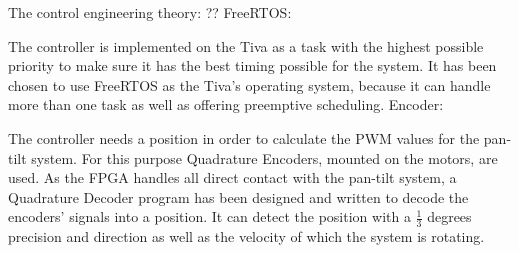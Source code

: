 \documentclass[../../main]{subfiles}
\begin{document}
The control engineering theory:
??
FreeRTOS:

The controller is implemented on the Tiva as a task with the highest possible priority to make sure it has the best timing possible for the system. It has been chosen to use FreeRTOS as the Tiva's operating system, because it can handle more than one task as well as offering preemptive scheduling.
Encoder:

The controller needs a position in order to calculate the PWM values for the pan-tilt system. For this purpose Quadrature Encoders, mounted on the motors, are used.
As the FPGA handles all direct contact with the pan-tilt system, a Quadrature Decoder program has been designed and written to decode the encoders' signals into a position.
It can detect the position with a $\frac{1}{3}$ degrees precision and direction as well as the velocity of which the system is rotating.
\end{document}
